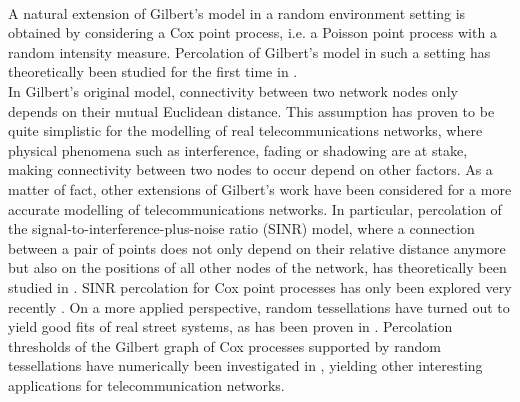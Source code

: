 \documentclass[10pt,a4paper]{amsart}
\theoremstyle{exampstyle}
\theoremstyle{exampnotations}
\begin{document}
\\ \indent A natural extension of Gilbert's model in a random environment setting is obtained by considering a Cox point process, i.e. a Poisson point process with a random intensity measure. Percolation of Gilbert's model in such a setting has theoretically been studied for the first time in \cite{hirsch2018continuum}. %
\\ \indent In Gilbert's original model, connectivity between two network nodes only depends on their mutual Euclidean distance. This assumption has proven to be quite simplistic for the modelling of real telecommunications networks, where physical phenomena such as interference, fading or shadowing are at stake, making connectivity between two nodes to occur depend on other factors. As a matter of fact, other extensions of Gilbert's work have been considered for a more accurate modelling of telecommunications networks. In particular, percolation of the signal-to-interference-plus-noise ratio (SINR) model, where a connection between a pair of points does not only depend on their relative distance anymore but also on the positions of all other nodes of the network, has theoretically been studied in \cite{dousse2006percolation}. SINR percolation for Cox point processes has only been explored very recently \cite{tobias2018signal}. On a more applied perspective, random tessellations have turned out to yield good fits of real street systems, as has been proven in \cite{gloaguen2006fitting}. Percolation thresholds of the Gilbert graph of Cox processes supported by random tessellations have numerically been investigated in \cite{cali2018percolation}, yielding other interesting applications for telecommunication networks. 
\end{document}

